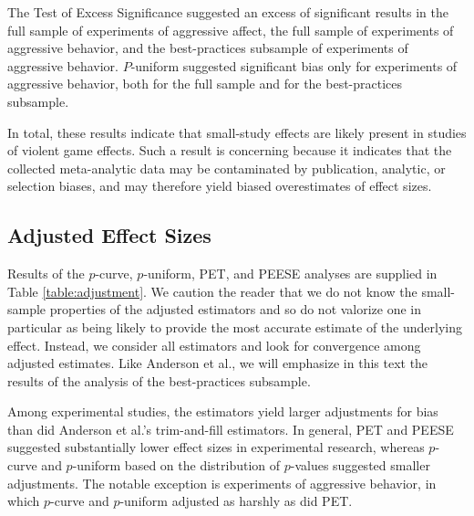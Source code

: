 \documentclass[man, mask]{apa6}
\begin{document}
The Test of Excess Significance suggested an excess of significant results in the full sample of experiments of aggressive affect, the full sample of experiments of aggressive behavior, and the best-practices subsample of experiments of aggressive behavior. $P$-uniform suggested significant bias only for experiments of aggressive behavior, both for the full sample and for the best-practices subsample.

In total, these results indicate that small-study effects are likely present in studies of violent game effects. Such a result is concerning because it indicates that the collected meta-analytic data may be contaminated by publication, analytic, or selection biases, and may therefore yield biased overestimates of effect sizes.

\subsection{Adjusted Effect Sizes}
Results of the $p$-curve, $p$-uniform, PET, and PEESE analyses are supplied in Table \ref{table:adjustment}. We caution the reader that we do not know the small-sample properties of the adjusted estimators and so do not valorize one in particular as being likely to provide the most accurate estimate of the underlying effect. Instead, we consider all estimators and look for convergence among adjusted estimates. Like Anderson et al., we will emphasize in this text the results of the analysis of the best-practices subsample.

Among experimental studies, the estimators yield larger adjustments for bias than did Anderson et al.'s trim-and-fill estimators. In general, PET and PEESE suggested substantially lower effect sizes in experimental research, whereas $p$-curve and $p$-uniform based on the distribution of $p$-values suggested smaller adjustments. The notable exception is experiments of aggressive behavior, in which $p$-curve and $p$-uniform adjusted as harshly as did PET.
\end{document}
